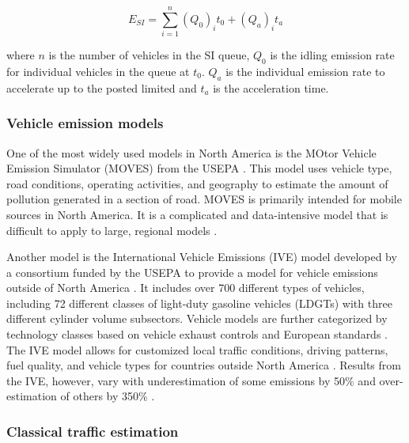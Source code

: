 \documentclass[preprint,12pt,a4paper]{elsarticle}
\begin{document}
\begin{linenumbers}
\begin{equation}
\label{eq:siemissions}
E_{SI}=\sum_{i=1}^{n}(Q_{0})_{i}t_{0} + (Q_{a})_{i}t_{a}
\end{equation}

\noindent
where $n$ is the number of vehicles in the SI queue, $Q_{0}$ is the idling emission rate for individual vehicles in the queue at $t_{0}$.  $Q_{a}$ is the individual emission rate to accelerate up to the posted limited  and $t_{a}$ is the  acceleration time.

\subsubsection{Vehicle emission models} \label{sssec:VehEmissionModels}

One of the most widely used models in North America is the MOtor Vehicle Emission Simulator (MOVES) from the USEPA \citep{MOVES2014a}. This model uses vehicle type, road conditions, operating activities, and geography to estimate the amount of pollution generated in a section of road. MOVES is primarily intended for mobile sources in North America. It is a complicated and data-intensive model that is difficult to apply to large, regional models \citep{Zhang2011}.

Another model is the International Vehicle Emissions (IVE) model developed by a consortium funded by the USEPA to provide a model for vehicle emissions outside of North America \citep{IVE2008}. It includes over 700 different types of vehicles, including 72 different classes of light-duty gasoline vehicles (LDGTs) with three different cylinder volume subsectors. Vehicle models are further categorized by technology classes based on vehicle exhaust controls and European standards \citep{Davis2005}. The IVE model allows for customized local traffic conditions, driving patterns, fuel quality, and vehicle types for countries outside North America \citep{Davis2010}. Results from the IVE, however, vary with underestimation of some emissions by 50\% and over-estimation of others by 350\% \citep{Hui2007}.

\subsubsection{Classical traffic estimation} \label{sssec:ClassicalTraffic}


\end{linenumbers}
\end{document}
